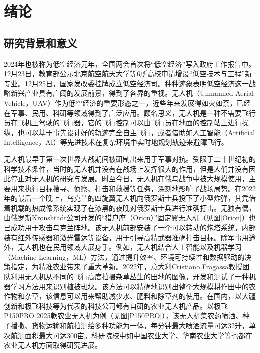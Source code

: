 \chapter{绪论}
%
\section{研究背景和意义}
%
2024年也被称为低空经济元年，全国两会首次将“低空经济”写入政府工作报告中。12月23日，教育部公示北京航空航天大学等6所高校申请增设“低空技术与工程”新专业。12月25日，国家发改委挂牌成立低空经济司。种种迹象表明低空经济这一战略新兴产业具有广阔的发展前景，得到了各界的重视。无人机（Unmanned Aerial Vehicle，UAV）作为低空经济的重要形态之一，近些年来发展得如火如荼，已经在军事、民用、科研等领域得到了广泛应用。顾名思义，无人机是一种不需要飞行员在飞机上驾驶的飞行器，它的飞行控制可以由飞行员在地面的控制站上进行操纵，也可以基于事先设计好的轨迹完全自主飞行，或者借助如人工智能（Artificial Intelligence，AI）等先进技术在复杂环境中实时地规划轨迹来避障飞行\cite{rezwanArtificialIntelligenceApproaches2022}。

无人机最早于第一次世界大战期间被研制出来用于军事对抗。受限于二十世纪初的科学技术条件，当时的无人机并没有在战场上发挥很大的作用，但是人们并没有因此停止对无人机的研究与发展。时至今日，无人机在俄乌战争中被大规模使用，主要用来执行目标搜寻、侦察、打击和救援等任务，深刻地影响了战场局势。在2022年的最后一个晚上，乌克兰的四旋翼无人机向俄罗斯士兵投下了小型炸弹，其凭借着机载的热成像系统实现了在漆黑的夜晚对俄罗斯士兵进行准确打击\cite{kunertovaWarUkraineShows2023}。无独有偶，由俄罗斯Kronshtadt公司开发的“猎户座（Orion）”固定翼无人机（见图\ref{Orion}）也已成功用于攻击乌克兰阵地。该无人机前部安装了一个可以转动的炮塔系统，内部装有红外传感器和激光雷达等设备，用于引导高精武器准确打击目标。除军事用途外，无人机也在民用领域大展身手。例如，无人机结合人工智能以及机器学习（Machine Learning，ML）方法，通过提升效率、环境可持续性和数据驱动的决策指定，为精准农业带来了重大革新\cite{agrawal2024transforming}。2022年，意大利Cristiano Fragassa教授团队利用无人机从不同的飞行高度拍摄杂草丛生的田地的图像，开发和测试了一种机器学习方法用来识别植被斑块。该方法可以精确地识别出整个大规模耕作田中的农作物和杂草，该信息可以用来帮助减少水、肥料和除草剂的使用\cite{fragassaNewProcedureCombining2023}。在国内，以大疆创新和极飞科技等为代表的科技公司都有自研的农业无人机产品。以极飞P150PRO 2025款农业无人机为例（见图\ref{P150PRO}），该无人机集农药喷洒、种子播撒、货物运输和航拍测绘多种功能为一体，每分钟最大喷洒流量可达32升，单次航测面积最大可达300亩。科研院校中如中国农业大学、华南农业大学\cite{liuAgriculturalUAVObstacle2024a}等也都在农业无人机方面取得研究进展。

